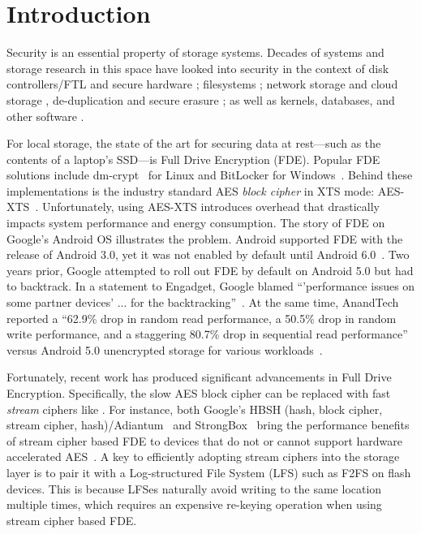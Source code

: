 \section{Introduction}\label{sec:introduction}


Security is an essential property of storage systems. Decades of systems and
storage research in this space have looked into security in the context of disk
controllers/FTL and secure hardware \cite{hardware1, hardware2, hardware3,
hardware4}; filesystems \cite{filesystems1, filesystems2, filesystems3,
filesystems4, filesystems5, filesystems6, filesystems7}; network storage and
cloud storage \cite{network1, network2, network3, network4, network5, network6,
network7, network8, network9, network10, network11, network12, network13,
network14, network15, network16}, de-duplication and secure erasure
\cite{erase1, erase2, erase3}; as well as kernels, databases, and other software
\cite{software1, software2, software3, software4}.

For local storage, the state of the art for securing data at rest---such as the
contents of a laptop's SSD---is Full Drive Encryption (FDE). Popular FDE
solutions include dm-crypt~\cite{dmcrypt, DmC-Android} for Linux and BitLocker
for Windows~\cite{bitlocker1, bitlocker2}. Behind these implementations is the
industry standard AES {\em block cipher} in XTS mode: AES-XTS~\cite{XTS,
XTSComments, NISTXTS}. Unfortunately, using AES-XTS introduces overhead that
drastically impacts system performance and energy consumption. The story of FDE
on Google's Android OS illustrates the problem. Android supported FDE with the
release of Android 3.0, yet it was not enabled by default until Android
6.0~\cite{android-M-mobile-motivation}. Two years prior, Google attempted to
roll out FDE by default on Android 5.0 but had to backtrack. In a statement to
Engadget, Google blamed ``'performance issues on some partner devices' ... for
the backtracking''~\cite{google-engadget}. At the same time, AnandTech reported
a ``62.9\% drop in random read performance, a 50.5\% drop in random write
performance, and a staggering 80.7\% drop in sequential read performance''
versus Android 5.0 unencrypted storage for various
workloads~\cite{android-M-mobile-motivation-2}.

Fortunately, recent work has produced significant advancements in Full
Drive Encryption. Specifically, the slow AES block cipher can be
replaced with fast {\em stream} ciphers like \encB. For instance, both
Google's HBSH (hash, block cipher, stream cipher,
hash)/Adiantum~\cite{Adiantum} and StrongBox~\cite{StrongBox} bring
the performance benefits of stream cipher based FDE to devices that do
not or cannot support hardware accelerated AES~\cite{StrongBox}. A key
to efficiently adopting stream ciphers into the storage layer is to
pair it with a Log-structured File System (LFS) such as F2FS\cite{F2FS} on flash
devices. This is because LFSes naturally avoid writing to the same
location multiple times, which requires an expensive re-keying
operation when using stream cipher based FDE.

